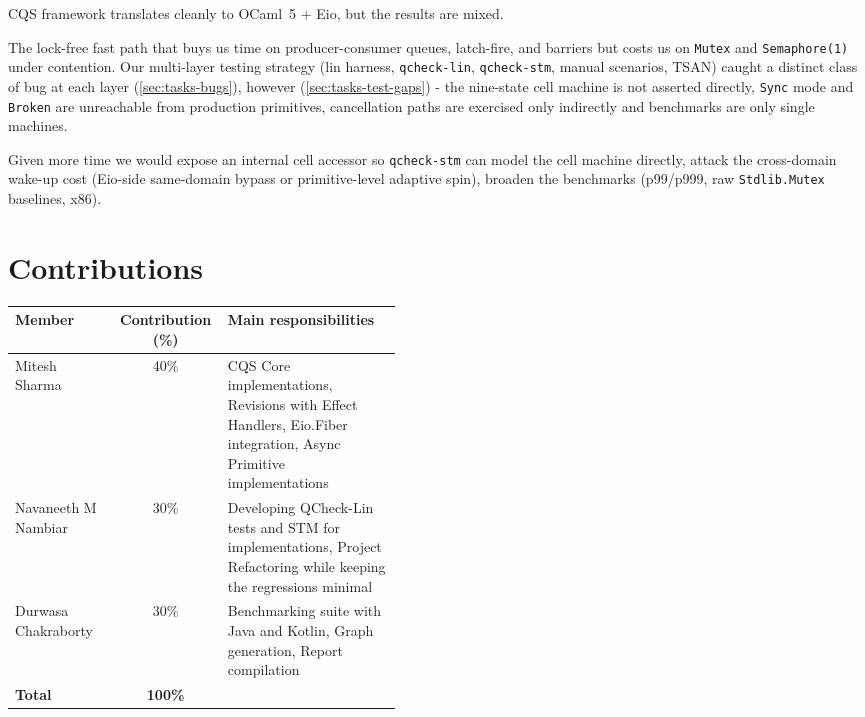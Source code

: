 \documentclass[11pt,a4paper]{article}
\begin{document}
CQS framework translates cleanly to OCaml~5 + Eio, but the results are mixed.

The lock-free fast path that buys us time on producer-consumer queues, latch-fire, and barriers but costs us  on \texttt{Mutex} and \texttt{Semaphore(1)} under contention. Our multi-layer testing strategy (lin harness, \texttt{qcheck-lin}, \texttt{qcheck-stm}, manual scenarios, TSAN) caught a distinct class of bug at each layer (\cref{sec:tasks-bugs}), however (\cref{sec:tasks-test-gaps}) -  the nine-state cell machine is not asserted directly, \texttt{Sync} mode and \texttt{Broken} are unreachable from production primitives, cancellation paths are exercised only indirectly and benchmarks are only single machines.

Given more time we would expose an internal cell accessor so \texttt{qcheck-stm} can model the cell machine directly, attack the cross-domain wake-up cost (Eio-side same-domain bypass or primitive-level adaptive spin), broaden the benchmarks (p99/p999, raw \texttt{Stdlib.Mutex} baselines, x86).





\section*{Contributions}
\label{sec:contributions}


\begin{center}
\begin{tabular}{@{}lc>{\raggedright\arraybackslash}p{0.45\linewidth}@{}}
\toprule
\textbf{Member} & \textbf{Contribution (\%)} & \textbf{Main responsibilities} \\
\midrule
Mitesh Sharma         & 40\% &  CQS Core implementations, Revisions with Effect Handlers, Eio.Fiber integration, Async Primitive implementations\\
Navaneeth M Nambiar & 30\% &  Developing QCheck-Lin tests and STM for implementations, Project Refactoring while keeping the regressions minimal\\
Durwasa Chakraborty   & 30\% & Benchmarking suite with Java and Kotlin, Graph generation, Report compilation \\
\midrule
\textbf{Total}        & \textbf{100\%} & \\
\bottomrule
\end{tabular}
\end{center}



\end{document}
